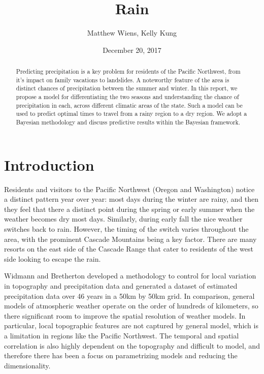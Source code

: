 \documentclass{article}
\begin{document}
\title{Rain}
\author{Matthew Wiens, Kelly Kung}
\date{December 20, 2017}
\maketitle
\begin{abstract}

Predicting precipitation is a key problem for residents of the Pacific Northwest, from it's impact on family vacations to landslides. A noteworthy feature of the area is distinct chances of precipitation between the summer and winter. In this report, we propose a model for differentiating the two seasons and understanding the chance of precipitation in each, across different climatic areas of the state. Such a model can be used to predict optimal times to travel from a rainy region to a dry region. We adopt a Bayesian methodology and  discuss predictive results within the Bayesian framework.  

\end{abstract}

\section{Introduction}

Residents and visitors to the Pacific Northwest (Oregon and Washington) notice a distinct pattern year over year: most days during the winter are rainy, and then they feel that there a distinct point during the spring or early summer when the weather becomes dry most days. Similarly, during early fall the nice weather switches back to rain.  However, the timing of the switch varies throughout the area, with the prominent Cascade Mountains being a key factor. There are many resorts on the east side of the Cascade Range that cater to residents of the west side looking to escape the rain. 

Widmann and Bretherton developed a methodology to control for local variation in topography and precipitation data and generated a dataset of estimated precipitation data over 46 years in a 50km by 50km grid.  In comparison, general models of atmospheric weather operate on the order of hundreds of kilometers, so there significant room to improve the spatial resolution of weather models.  In particular, local topographic features are not captured by general model, which is a limitation in regions like the Pacific Northwest.
The temporal and spatial correlation is also highly dependent on the topography and difficult to model, and therefore there has been a focus on parametrizing models and reducing the dimensionality. 
\end{document}
